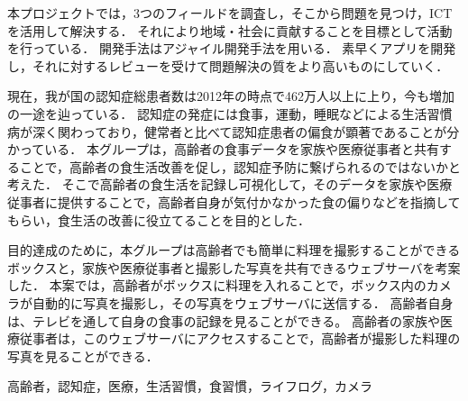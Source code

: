 \documentclass[../report]{subfiles}
\begin{document}
\begin{jabstract}
本プロジェクトでは，3つのフィールドを調査し，そこから問題を見つけ，ICTを活用して解決する．
それにより地域・社会に貢献することを目標として活動を行っている．
開発手法はアジャイル開発手法を用いる．
素早くアプリを開発し，それに対するレビューを受けて問題解決の質をより高いものにしていく．

現在，我が国の認知症総患者数は2012年の時点で462万人以上に上り，今も増加の一途を辿っている．
認知症の発症には食事，運動，睡眠などによる生活習慣病が深く関わっており，健常者と比べて認知症患者の偏食が顕著であることが分かっている．
本グループは，高齢者の食事データを家族や医療従事者と共有することで，高齢者の食生活改善を促し，認知症予防に繋げられるのではないかと考えた．
そこで高齢者の食生活を記録し可視化して，そのデータを家族や医療従事者に提供することで，高齢者自身が気付かなかった食の偏りなどを指摘してもらい，食生活の改善に役立てることを目的とした．

目的達成のために，本グループは高齢者でも簡単に料理を撮影することができるボックスと，家族や医療従事者と撮影した写真を共有できるウェブサーバを考案した．
本案では，高齢者がボックスに料理を入れることで，ボックス内のカメラが自動的に写真を撮影し，その写真をウェブサーバに送信する．
高齢者自身は、テレビを通して自身の食事の記録を見ることができる。
高齢者の家族や医療従事者は，このウェブサーバにアクセスすることで，高齢者が撮影した料理の写真を見ることができる．
\begin{jkeyword}
高齢者，認知症，医療，生活習慣，食習慣，ライフログ，カメラ
\end{jkeyword}
\end{jabstract}
\end{document}
